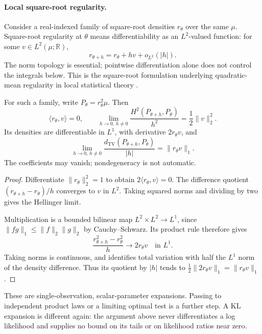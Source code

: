 \paragraph{Local square-root regularity.}

Consider a real-indexed family of square-root densities $r_\theta$ over
the same $\mu$. Square-root regularity at $\theta$ means differentiability
as an $L^2$-valued function: for some $v\in L^2(\mu;\mathbb R)$,
\[
 r_{\theta+h}=r_\theta+h v+o_{L^2}(|h|).
\]
The norm topology is essential; pointwise differentiation alone does
not control the integrals below. This is the square-root formulation
underlying quadratic-mean regularity in local statistical theory
\cite{duchi2018localTesting}.

\begin{theorem}
\label{thm:local-density-distances}
For such a family, write $P_\theta=r_\theta^2\mu$. Then
\[
 \langle r_\theta,v\rangle=0,
 \qquad
 \lim_{h\to0,\,h\ne0}\frac{H^2(P_{\theta+h},P_\theta)}{h^2}
 =\frac12\|v\|_2^2.
\]
Its densities are differentiable in $L^1$, with derivative
$2r_\theta v$, and
\[
 \lim_{h\to0,\,h\ne0}
 \frac{d_{\mathrm{TV}}(P_{\theta+h},P_\theta)}{|h|}
 =\|r_\theta v\|_1.
\]
The coefficients may vanish; nondegeneracy is not automatic.
\end{theorem}
\begin{proof}
Differentiate $\|r_\theta\|_2^2=1$ to obtain
$2\langle r_\theta,v\rangle=0$.
The difference quotient $(r_{\theta+h}-r_\theta)/h$ converges to $v$
in $L^2$. Taking squared norms and dividing by two gives the Hellinger
limit.

Multiplication is a bounded bilinear map
$L^2\times L^2\to L^1$, since
$\|fg\|_1\le\|f\|_2\|g\|_2$ by Cauchy--Schwarz.
Its product rule therefore gives
\[
 \frac{r_{\theta+h}^2-r_\theta^2}{h}
 \longrightarrow 2r_\theta v\quad\text{in }L^1.
\]
Taking norms is continuous, and  identifies
total variation with half the $L^1$ norm of the density difference.
Thus its quotient by $|h|$ tends to
$\tfrac12\|2r_\theta v\|_1=\|r_\theta v\|_1$.
\end{proof}

These are single-observation, scalar-parameter expansions. Passing
to independent product laws or a limiting optimal test is a further
step. A KL expansion is different again: the argument above never
differentiates a log likelihood and supplies no bound on its tails
or on likelihood ratios near zero.
